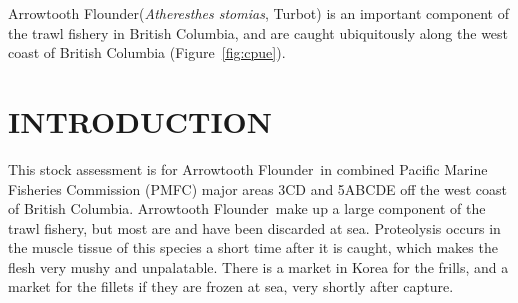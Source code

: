 \documentclass[11pt]{book}\usepackage[]{graphicx}\usepackage[]{color}
\newcommand{\fishname}{Arrowtooth Flounder}
\newcommand{\sciencename}{Atheresthes stomias}
\begin{document}
\def \KnitrHomePath {C:/github/csas-latex/doc}



\setcounter{secnumdepth}{3}    %

\renewcommand{\thesection}{\arabic{section}}
\renewcommand{\thetable}{\arabic{table}}
\renewcommand{\thefigure}{\arabic{figure}}
\renewcommand{\theequation}{\arabic{equation}}




\fishname (\emph{\sciencename}, Turbot) is an important component of the trawl fishery in British Columbia, and are caught ubiquitously along the west coast of British Columbia (Figure~\ref{fig:cpue}).

\newpage	%



\clearpage

\setcounter{page}{1}

\section{INTRODUCTION}

This stock assessment is for \fishname\ in combined Pacific Marine Fisheries Commission (PMFC) major areas 3CD and 5ABCDE off the west coast of British Columbia. \fishname\ make up a large component of the trawl fishery, but most are and have been discarded at sea. Proteolysis occurs in the muscle tissue of this species a short time after it is caught, which makes the flesh very mushy and unpalatable. There is a market in Korea for the frills, and a market for the fillets if they are frozen at sea, very shortly after capture.
\end{document}
